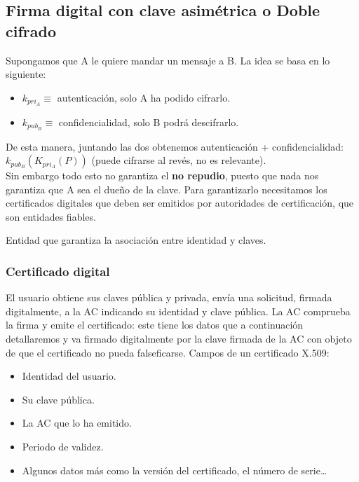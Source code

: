 \subsection{Firma digital con clave asimétrica o Doble cifrado}

Supongamos que A le quiere mandar un mensaje a B. La idea se basa en lo siguiente:
\begin{itemize}
    \item $k_{pri_A}\equiv$ autenticación, solo A ha podido cifrarlo.
    \item $k_{pub_B}\equiv$ confidencialidad, solo B podrá descifrarlo.
\end{itemize}
De esta manera, juntando las dos obtenemos autenticación + confidencialidad: $k_{pub_B}(K_{pri_A} (P))$ (puede cifrarse al revés, no es relevante).\\

Sin embargo todo esto no garantiza el \textbf{no repudio}, puesto que nada nos garantiza que A sea el dueño de la clave. Para garantizarlo necesitamos los certificados digitales que deben ser emitidos por autoridades de certificación, que son entidades fiables. 

\begin{definicion}
    Entidad que garantiza la asociación entre identidad y claves.
\end{definicion}

\subsubsection{Certificado digital}
El usuario obtiene sus claves pública y privada, envía una solicitud, firmada digitalmente, a la AC indicando su identidad y clave pública. La AC comprueba la firma y emite el certificado: este tiene los datos que a continuación detallaremos y va firmado digitalmente por la clave firmada de la AC con objeto de que el certificado no pueda falseficarse. Campos de un certificado X\@.509:
\begin{itemize}
    \item Identidad del usuario.
    \item Su clave pública.
    \item La AC que lo ha emitido.
    \item Periodo de validez.
    \item Algunos datos más como la versión del certificado, el número de serie\ldots
\end{itemize}


